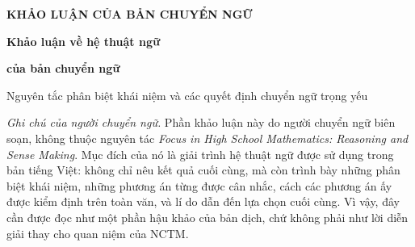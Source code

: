 
\cleardoublepage
\gdef\CurrentRunningHead{Khảo luận về hệ thuật ngữ của bản chuyển ngữ}

{}

\begingroup
{}

\thispagestyle{plain}

\begin{center}
{\small\bfseries KHẢO LUẬN CỦA BẢN CHUYỂN NGỮ\par}

\vspace{0.9\baselineskip}

{\Large\bfseries Khảo luận về hệ thuật ngữ\par}

\vspace{0.15\baselineskip}

{\Large\bfseries của bản chuyển ngữ\par}

\vspace{0.65\baselineskip}

{\large Nguyên tắc phân biệt khái niệm và các quyết định chuyển ngữ trọng yếu\par}
\end{center}

\vspace{1.15\baselineskip}

\begingroup
\small

\noindent
\textit{Ghi chú của người chuyển ngữ.}
Phần khảo luận này do người chuyển ngữ biên soạn, không thuộc nguyên tác \emph{Focus in High School Mathematics: Reasoning and Sense Making}. Mục đích của nó là giải trình hệ thuật ngữ được sử dụng trong bản tiếng Việt: không chỉ nêu kết quả cuối cùng, mà còn trình bày những phân biệt khái niệm, những phương án từng được cân nhắc, cách các phương án ấy được kiểm định trên toàn văn, và lí do dẫn đến lựa chọn cuối cùng. Vì vậy, đây cần được đọc như một phần hậu khảo của bản dịch, chứ không phải như lời diễn giải thay cho quan niệm của NCTM.

\endgroup

